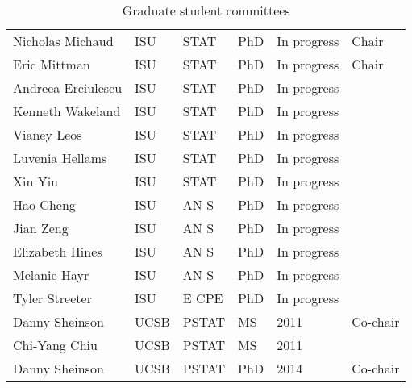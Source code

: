 \begin{table}[h]
\begin{tabular}{llllll}
  Nicholas Michaud & ISU & STAT & PhD & In progress & Chair \\ 
  Eric Mittman & ISU & STAT & PhD & In progress & Chair \\ 
  Andreea Erciulescu & ISU & STAT & PhD & In progress &  \\ 
  Kenneth Wakeland & ISU & STAT & PhD & In progress &  \\ 
  Vianey Leos & ISU & STAT & PhD & In progress &  \\ 
  Luvenia Hellams & ISU & STAT & PhD & In progress &  \\ 
  Xin Yin & ISU & STAT & PhD & In progress &  \\ 
  Hao Cheng & ISU & AN S & PhD & In progress &  \\ 
  Jian Zeng & ISU & AN S & PhD & In progress &  \\ 
  Elizabeth Hines & ISU & AN S & PhD & In progress &  \\ 
  Melanie Hayr & ISU & AN S & PhD & In progress &  \\ 
  Tyler Streeter & ISU & E CPE & PhD & In progress &  \\ 
  Danny Sheinson & UCSB & PSTAT & MS & 2011 & Co-chair \\ 
  Chi-Yang Chiu & UCSB & PSTAT & MS & 2011 &  \\ 
  Danny Sheinson & UCSB & PSTAT & PhD & 2014 & Co-chair \\ 
   \hline
\end{tabular}
\caption{Graduate student committees} 
\label{tab:studentcommittees}
\end{table}
